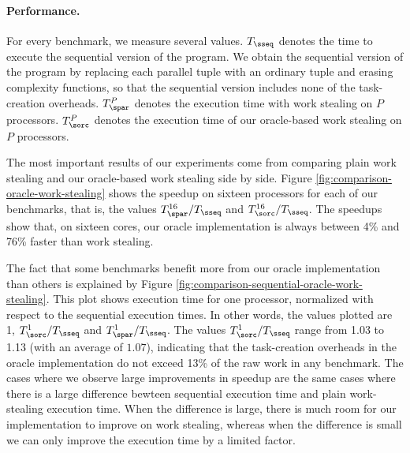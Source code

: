 
\paragraph{Performance.}

For every benchmark, we measure several values.
$T_\sseq$ denotes
the time to execute the sequential version of the program.
We obtain the sequential version of the program by replacing each 
parallel tuple with an ordinary tuple and erasing complexity functions,
so that the sequential version includes none of the task-creation overheads.
$T_\spar^P$ denotes the execution time with work stealing on $P$ processors.
$T_\sorc^P$ denotes the execution time of our 
oracle-based work stealing on $P$ processors.

The most important results of our experiments come from comparing
plain work stealing and our oracle-based work stealing side by
side. Figure \ref{fig:comparison-oracle-work-stealing} shows the
speedup on sixteen processors for each of our benchmarks,
that is, the values $T_\spar^{16}/T_\sseq$ and $T_\sorc^{16}/T_\sseq$.
The speedups show that, on sixteen cores, our oracle implementation is
always between 4\% and 76\% faster than work stealing. 

The fact that some benchmarks benefit more from our oracle implementation 
than others is explained by Figure
\ref{fig:comparison-sequential-oracle-work-stealing}. This plot shows
execution time for one processor, normalized with respect to the  
sequential execution times. In other words, the values plotted
are 1, $T_\sorc^{1}/T_\sseq$ and $T_\spar^{1}/T_\sseq$.
The values $T_\sorc^{1}/T_\sseq$ range from 1.03 to 1.13 (with an average
of $1.07$), indicating that the task-creation overheads in the oracle 
implementation do not exceed 13\% of the raw work in any benchmark.
The cases where we observe large improvements in speedup are the same
cases where there is a large difference bewteen sequential execution
time and plain work-stealing execution time. When the difference is
large, there is much room for our implementation to improve on work
stealing, whereas when the difference is small
we can only improve the execution time by a limited factor.

